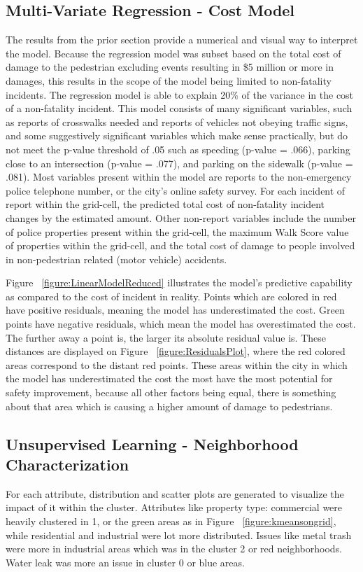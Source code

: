 \documentclass{llncs}
\begin{document}
\subsection{Multi-Variate Regression - Cost Model}
The results from the prior section provide a numerical and visual way to interpret the model. Because the regression model was subset based on the total cost of damage to the pedestrian excluding events resulting in \$5 million or more in damages, this results in the scope of the model being limited to non-fatality incidents. The regression model is able to explain 20\% of the variance in the cost of a non-fatality incident. This model consists of many significant variables, such as reports of crosswalks needed and reports of vehicles not obeying traffic signs, and some suggestively significant variables which make sense practically, but do not meet the p-value threshold of .05 such as speeding (p-value = .066), parking close to an intersection (p-value = .077), and parking on the sidewalk (p-value = .081). Most variables present within the model are reports to the non-emergency police telephone number, or the city’s online safety survey. For each incident of report within the grid-cell, the predicted total cost of non-fatality incident changes by the estimated amount. Other non-report variables include the number of police properties present within the grid-cell, the maximum Walk Score value of properties within the grid-cell, and the total cost of damage to people involved in non-pedestrian related (motor vehicle) accidents. 

Figure ~\ref{figure:LinearModelReduced} illustrates the model’s predictive capability as compared to the cost of incident in reality. Points which are colored in red have positive residuals, meaning the model has underestimated the cost. Green points have negative residuals, which mean the model has overestimated the cost. The further away a point is, the larger its absolute residual value is. These distances are displayed on Figure ~\ref{figure:ResidualsPlot}, where the red colored areas correspond to the distant red points. These areas within the city in which the model has underestimated the cost the most have the most potential for safety improvement, because all other factors being equal, there is something about that area which is causing a higher amount of damage to pedestrians.

\subsection{Unsupervised Learning - Neighborhood Characterization}
For each attribute, distribution and scatter plots are generated to visualize the impact of it within the cluster. Attributes like property type: commercial were heavily clustered in 1, or the green areas as in Figure ~\ref{figure:kmeansongrid}, while residential and industrial were lot more distributed. Issues like metal trash were more in industrial areas which was in the cluster 2 or red neighborhoods. Water leak was more an issue in cluster 0 or blue areas.
\end{document}
